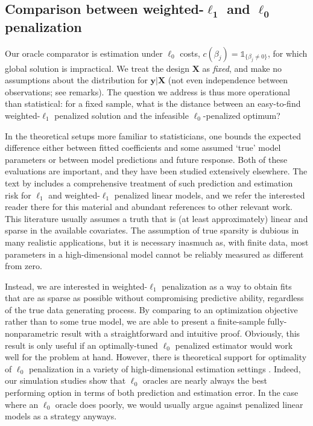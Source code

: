 \documentclass[12pt]{article}
\newcommand{\bs}[1]{\boldsymbol{#1}}
\newcommand{\bm}[1]{\mathbf{#1}}
\newcommand{\ds}[1]{\mathds{#1}}
\begin{document}
\subsection{Comparison between weighted-$\bs{\ell_1}$ and $\bs{\ell_0}$ penalization}


Our oracle comparator is estimation under $\ell_0$ costs, $c(\beta_j) =
\ds{1}_{\{\beta_j\neq0\}}$, for which global solution is impractical.  We
treat the design $\bm{X}$ as {\it fixed}, and make no assumptions
about the distribution for $\bm{y} | \bm{X}$ (not even independence between
observations; see remarks).   The question we address is thus more
operational than statistical: for a fixed sample, what is the distance between
an easy-to-find weighted-$\ell_1$ penalized solution and the infeasible
$\ell_0$-penalized optimum?

In the theoretical setups more familiar to statisticians,
one bounds the expected difference  either between fitted coefficients
and some assumed `true' model parameters or  between model predictions and future
response.  Both of these evaluations are important, and they have been studied
extensively elsewhere. The text by \cite{buhlmann_statistics_2011}
includes a comprehensive treatment of such prediction and estimation risk for
$\ell_1$ and weighted-$\ell_1$ penalized linear models,  and we refer the
interested reader there for this material and abundant references to other
relevant work.  This literature usually assumes a truth that is (at least
approximately) linear and sparse in the available covariates.  The assumption
of true sparsity is dubious in many realistic applications, but it is
necessary inasmuch as, with finite data, most parameters in a
high-dimensional model cannot be reliably measured as different from zero.

Instead, we are
interested in weighted-$\ell_1$ penalization as a way to obtain fits that are
as sparse as possible without compromising predictive ability, regardless of the true data generating process.  By comparing
to an optimization objective rather than to some true model, we are able to
present a finite-sample fully-nonparametric result with a straightforward and intuitive proof. Obviously, this result is only useful if an optimally-tuned $\ell_0$
penalized estimator would work well for the problem at hand. However,  there
is theoretical support for optimality of $\ell_0$ penalization in a
 variety of high-dimensional estimation settings
\citep[e.g,][]{mallows_comments_1973,efron_estimation_2004}.  Indeed, our
simulation studies show that $\ell_0$ oracles are nearly always the
best performing option in terms of both prediction and estimation error.  In
the case where an $\ell_0$ oracle does poorly, we would usually argue against
penalized linear models as a strategy anyways.
\end{document}

